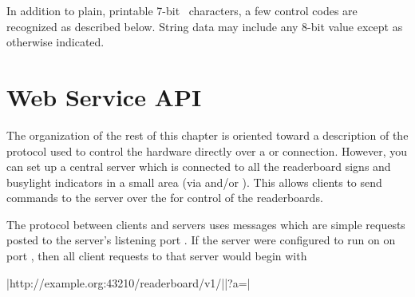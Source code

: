 In addition to plain, printable 7-bit \ascii\ characters, a few control codes are
recognized as described below. String data may include any 8-bit value except as otherwise
indicated.

%
%
%
\section{Web Service API}
The organization of the rest of this chapter is oriented toward a description of the
protocol used to control the hardware directly over a  or 
connection. However, you can set up a central server which is connected to all the
readerboard signs and busylight indicators in a small area (via  and/or ).
This allows clients to send commands to the server over the  for control of the readerboards.

The protocol between clients and servers uses messages which are simple  requests
posted to the server's listening port . If the server were configured to run
on  on port , then all client requests to that server would begin with

\begin{Coding}
	|http://example.org:43210/readerboard/v1/||?a=|
\end{Coding}

